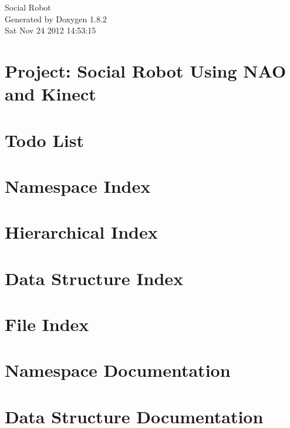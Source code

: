 \documentclass{book}
\begin{document}
\hypersetup{pageanchor=false,citecolor=blue}
\begin{titlepage}
\vspace*{7cm}
\begin{center}
{\Large Social Robot }\\
\vspace*{1cm}
{\large Generated by Doxygen 1.8.2}\\
\vspace*{0.5cm}
{\small Sat Nov 24 2012 14:53:15}\\
\end{center}
\end{titlepage}
\clearemptydoublepage
{}
\tableofcontents
\clearemptydoublepage
{}
\hypersetup{pageanchor=true,citecolor=blue}
\chapter{Project\-: Social Robot Using N\-A\-O and Kinect}
\label{index}\hypertarget{index}{}
\chapter{Todo List}
\label{todo}
\hypertarget{todo}{}

\chapter{Namespace Index}

\chapter{Hierarchical Index}

\chapter{Data Structure Index}

\chapter{File Index}

\chapter{Namespace Documentation}



\chapter{Data Structure Documentation}























\end{document}
